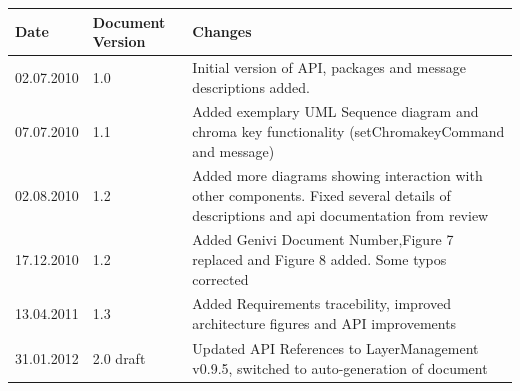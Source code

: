 \documentclass[a4paper]{article}
\begin{document}
\begin{titlepage}
\begin{tabular}{ | l | l | p{9.5cm} | }
\hline
Date & Document Version & Changes \\
\hline
02.07.2010 & 1.0 & Initial version of API, packages and message descriptions added. \\
\hline
07.07.2010 & 1.1 & Added exemplary UML Sequence diagram and chroma key functionality (setChromakeyCommand and message) \\
\hline
02.08.2010 & 1.2 & Added more diagrams showing interaction with other components. Fixed several details of descriptions and api documentation from review \\
\hline
17.12.2010 & 1.2 & Added Genivi Document Number,Figure 7 replaced and Figure 8 added. Some typos corrected \\
\hline
13.04.2011 & 1.3 & Added Requirements tracebility, improved architecture figures and API improvements \\
\hline
31.01.2012 & 2.0 draft & Updated API References to LayerManagement v0.9.5, switched to auto-generation of document \\
\hline
\end{tabular}


\end{titlepage}
\clearemptydoublepage
{}
\tableofcontents
\clearemptydoublepage
{}
\hypersetup{pageanchor=true}
\end{document}
